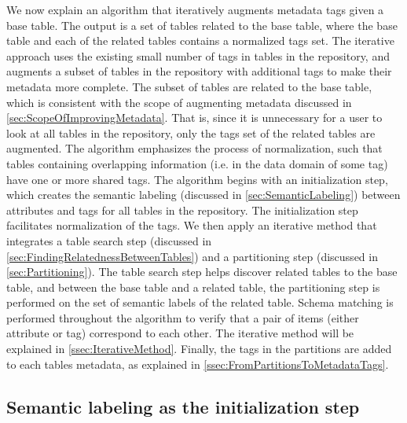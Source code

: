 We now explain an algorithm that iteratively augments metadata tags given a base table. The output is a set of tables related to the base table, where the base table and each of the related tables contains a normalized tags set. The iterative approach uses the existing small number of tags in tables in the repository, and augments a subset of tables in the repository with additional tags to make their metadata more complete. The subset of tables are related to the base table, which is consistent with the scope of augmenting metadata discussed in \autoref{sec:ScopeOfImprovingMetadata}. That is, since it is unnecessary for a user to look at all tables in the repository, only the tags set of the related tables are augmented. The algorithm emphasizes the process of normalization, such that tables containing overlapping information (i.e. in the data domain of some tag) have one or more shared tags.
The algorithm begins with an initialization step, which creates the semantic labeling (discussed in \autoref{sec:SemanticLabeling}) between attributes and tags for all tables in the repository. The initialization step facilitates normalization of the tags. We then apply an iterative method that integrates a table search step (discussed in \autoref{sec:FindingRelatednessBetweenTables}) and a partitioning step (discussed in \autoref{sec:Partitioning}). The table search step helps discover related tables to the base table, and between the base table and a related table, the partitioning step is performed on the set of semantic labels of the related table. Schema matching is performed throughout the algorithm to verify that a pair of items (either attribute or tag) correspond to each other. The iterative method will be explained in \autoref{ssec:IterativeMethod}. Finally, the tags in the partitions are added to each tables metadata, as explained in \autoref{ssec:FromPartitionsToMetadataTags}.

\subsection{Semantic labeling as the initialization step}
\label{ssec:SemanticLabelingAsTheInitializationStep}

